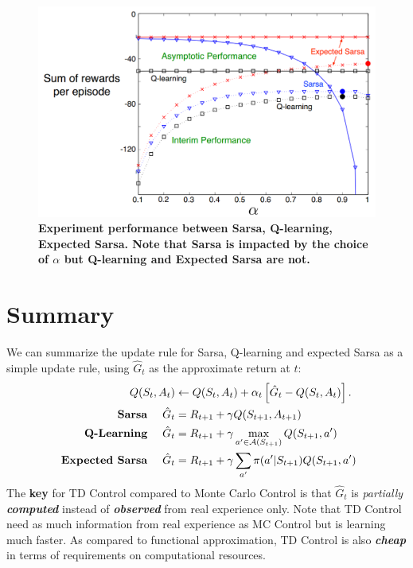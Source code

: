 \documentclass[11pt]{article}
\begin{document}
\begin{figure}
\begin{minipage}[t]{1\linewidth}
  \centering
  \centerline{\includegraphics[scale = 0.3]{comp_q_sarsa_exp.png}}
\end{minipage}
\caption{\footnotesize{\textbf{Experiment performance between Sarsa, Q-learning, Expected Sarsa. Note that Sarsa is impacted by the choice of $\alpha$ but Q-learning and Expected Sarsa are not.}}}
\label{fig: q_learning}
\end{figure}

\section{Summary}
We can summarize the update rule for Sarsa, Q-learning and expected Sarsa as a simple update rule, using $\hat{G}_{t}$ as the approximate return at $t$: 
\begin{align*}
Q(S_{t}, A_{t}) &\leftarrow Q(S_{t}, A_{t}) + \alpha_{t}\left[\hat{G}_{t}  - Q(S_{t}, A_{t})\right].  \\
 \text{  \textbf{Sarsa} }\quad\hat{G}_{t} &= R_{t+1} + \gamma Q(S_{t+1}, A_{t+1}) \\
\text{  \textbf{Q-Learning} }\quad\hat{G}_{t} &=  R_{t+1} + \gamma \max_{a'\in {\mathcal A}(S_{t+1})}Q(S_{t+1}, a')  \\
 \text{  \textbf{Expected Sarsa} }\quad\hat{G}_{t} &= R_{t+1} + \gamma\sum_{a'}\pi(a'|S_{t+1})Q(S_{t+1}, a') 
\end{align*} The \textbf{key} for TD Control compared to Monte Carlo Control is that  $\hat{G}_{t}$ is \emph{partially \textbf{computed}} instead of \emph{\textbf{observed}} from real experience only.  Note that TD Control need as much information from real experience as MC Control but is learning much faster. As compared to functional approximation, TD Control is also \emph{\textbf{cheap}} in terms of requirements on computational resources.  

\newpage


\end{document}
